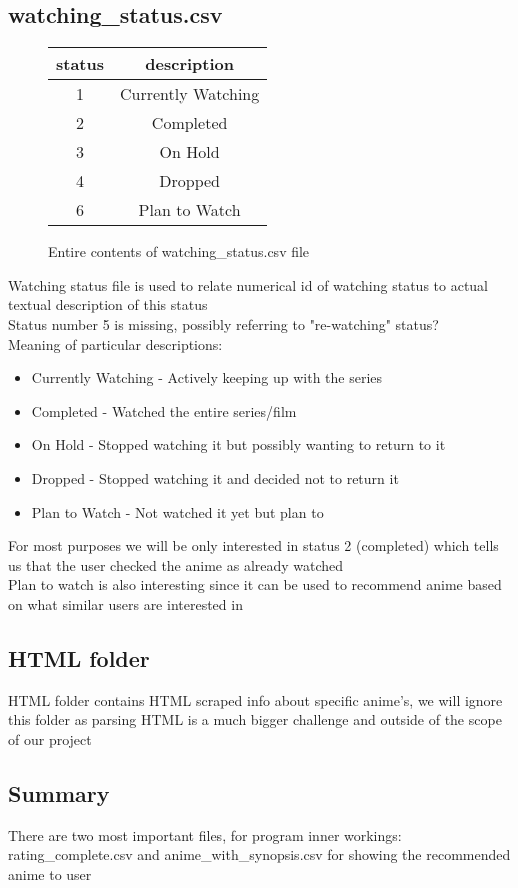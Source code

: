 \documentclass[12pt]{article}
\begin{document}
\subsection{watching\_status.csv}
\label{watchingStatus}
\begin{figure}[h]
\caption{Entire contents of watching\_status.csv file}
\centering
\begin{tabular}{| c | c |}
\hline
status & description \\ 
\hline
1 & Currently Watching \\
\hline
2 & Completed \\
\hline
3 & On Hold \\
\hline
4 & Dropped \\
\hline
6 & Plan to Watch \\
\hline
\end{tabular}
\end{figure}

Watching status file is used to relate numerical id of watching status to actual textual description of this status \\ 
Status number 5 is missing, possibly referring to "re-watching" status? \\ 
Meaning of particular descriptions:
\begin{itemize}
    \item Currently Watching - Actively keeping up with the series
    \item Completed - Watched the entire series/film
    \item On Hold - Stopped watching it but possibly wanting to return to it
    \item Dropped - Stopped watching it and decided not to return it 
    \item Plan to Watch  - Not watched it yet but plan to
\end{itemize}
For most purposes we will be only interested in status 2 (completed) which tells us that the user checked the anime as already watched \\ 
Plan to watch is also interesting since it can be used to recommend anime based on what similar users are interested in
\subsection{HTML folder}
HTML folder contains HTML scraped info about specific anime's, we will ignore this folder as parsing HTML is a much bigger challenge and outside of the scope of our project
\subsection{Summary}
There are two most important files, for program inner workings: rating\_complete.csv and anime\_with\_synopsis.csv for showing the recommended anime to user
\end{document}
